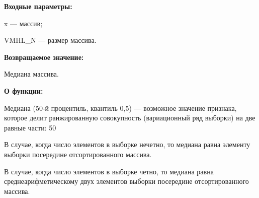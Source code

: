 \textbf{Входные параметры:}

 x --- массив;
 
 VMHL\_N --- размер массива.

\textbf{Возвращаемое значение:}

 Медиана массива.
 
\textbf{ О функции:}

Медиана (50-й процентиль, квантиль 0,5) — возможное значение признака, которое делит ранжированную совокупность (вариационный ряд выборки) на две равные части: 50 %

В случае, когда число элементов в выборке нечетно, то медиана равна элементу выборки посередине отсортированного массива.

В случае, когда число элементов в выборке четно, то медиана равна среднеарифметическому двух элементов выборки посередине отсортированного массива.
